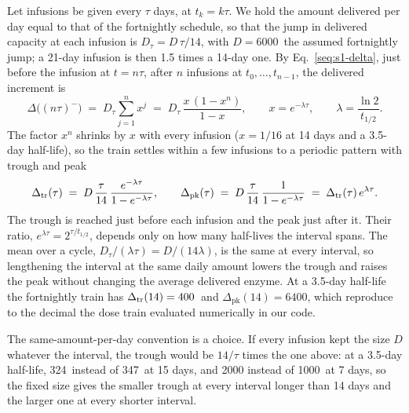 Let infusions be given every $\tau$ days, at $t_k=k\tau$. We hold the amount delivered per day
equal to that of the fortnightly schedule, so that the jump in delivered capacity at each
infusion is $D_\tau=D\,\tau/14$, with $D=6000$\um\ the assumed fortnightly jump; a 21-day
infusion is then 1.5 times a 14-day one. By Eq.~\eqref{seq:s1-delta}, just before the
infusion at $t=n\tau$, after $n$ infusions at $t_0,\dots,t_{n-1}$, the delivered increment is
\begin{equation}
\label{seq:s6-partial}
\Delta\bigl((n\tau)^{-}\bigr)\;=\;D_\tau\sum_{j=1}^{n}x^{j}\;=\;D_\tau\,\frac{x\,(1-x^{n})}{1-x},
\qquad x=e^{-\lambda\tau},\qquad \lambda=\frac{\ln2}{t_{1/2}} .
\end{equation}
The factor $x^{n}$ shrinks by $x$ with every infusion ($x=1/16$ at 14 days and a 3.5-day
half-life), so the train settles within a few infusions to a periodic pattern with trough and
peak
\begin{equation}
\label{seq:s6-trough}
\Delta_{\mathrm{tr}}(\tau)\;=\;D\,\frac{\tau}{14}\,\frac{e^{-\lambda\tau}}{1-e^{-\lambda\tau}},\qquad
\Delta_{\mathrm{pk}}(\tau)\;=\;D\,\frac{\tau}{14}\,\frac{1}{1-e^{-\lambda\tau}}
\;=\;\Delta_{\mathrm{tr}}(\tau)\,e^{\lambda\tau}.
\end{equation}
The trough is reached just before each infusion and the peak just after it. Their ratio,
$e^{\lambda\tau}=2^{\tau/t_{1/2}}$, depends only on how many half-lives the interval spans. The
mean over a cycle, $D_\tau/(\lambda\tau)=D/(14\lambda)$, is the same at every interval, so
lengthening the interval at the same daily amount lowers the trough and raises the peak without
changing the average delivered enzyme. At a 3.5-day half-life the fortnightly train has
$\Delta_{\mathrm{tr}}(14)=400$\um\ and $\Delta_{\mathrm{pk}}(14)=6400$\um, which reproduce to the decimal the
dose train evaluated numerically in our code.

The same-amount-per-day convention is a choice. If every infusion kept the size $D$ whatever
the interval, the trough would be $14/\tau$ times the one above: at a 3.5-day half-life,
324\um\ instead of 347\um\ at 15 days, and 2000 instead of 1000\um\ at 7 days, so the fixed size
gives the smaller trough at every interval longer than 14 days and the larger one at every
shorter interval.


